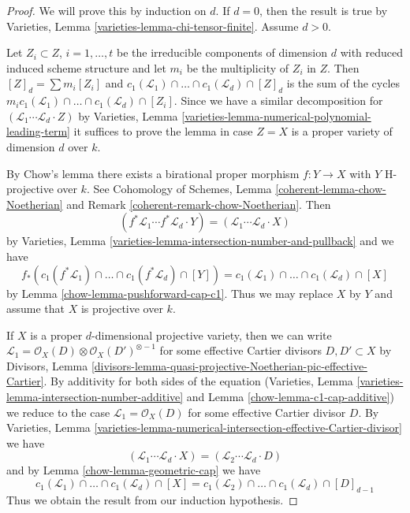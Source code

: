 \begin{proof}

We will prove this by induction on $d$. If $d = 0$, then the result is
true by Varieties, Lemma \ref{varieties-lemma-chi-tensor-finite}.
Assume $d > 0$.

\medskip\noindent
Let $Z_i \subset Z$, $i = 1, \ldots, t$ be the irreducible components
of dimension $d$ with reduced induced scheme structure and let $m_i$ be the
multiplicity of $Z_i$ in $Z$. Then $[Z]_d = \sum m_i[Z_i]$ and
$c_1(\mathcal{L}_1) \cap \ldots \cap c_1(\mathcal{L}_d) \cap [Z]_d$
is the sum of the cycles
$m_i c_1(\mathcal{L}_1) \cap \ldots \cap c_1(\mathcal{L}_d) \cap [Z_i]$.
Since we have a similar decomposition for
$(\mathcal{L}_1 \cdots \mathcal{L}_d \cdot Z)$ by
Varieties, Lemma \ref{varieties-lemma-numerical-polynomial-leading-term}
it suffices to prove the lemma in case $Z = X$
is a proper variety of dimension $d$ over $k$.

\medskip\noindent
By Chow's lemma there exists a birational proper morphism $f : Y \to X$
with $Y$ H-projective over $k$. See Cohomology of Schemes, Lemma
\ref{coherent-lemma-chow-Noetherian} and Remark
\ref{coherent-remark-chow-Noetherian}. Then
$$
(f^*\mathcal{L}_1 \cdots f^*\mathcal{L}_d \cdot Y) =
(\mathcal{L}_1 \cdots \mathcal{L}_d \cdot X)
$$
by Varieties, Lemma \ref{varieties-lemma-intersection-number-and-pullback}
and we have
$$
f_*(c_1(f^*\mathcal{L}_1) \cap \ldots \cap c_1(f^*\mathcal{L}_d) \cap [Y]) =
c_1(\mathcal{L}_1) \cap \ldots \cap c_1(\mathcal{L}_d) \cap [X]
$$
by Lemma \ref{chow-lemma-pushforward-cap-c1}. Thus we may replace $X$ by $Y$
and assume that $X$ is projective over $k$.

\medskip\noindent
If $X$ is a proper $d$-dimensional projective variety, then we can
write $\mathcal{L}_1 = \mathcal{O}_X(D) \otimes \mathcal{O}_X(D')^{\otimes -1}$
for some effective Cartier divisors $D, D' \subset X$
by Divisors, Lemma
\ref{divisors-lemma-quasi-projective-Noetherian-pic-effective-Cartier}.
By additivity for both sides of the equation
(Varieties, Lemma \ref{varieties-lemma-intersection-number-additive} and
Lemma \ref{chow-lemma-c1-cap-additive})
we reduce to the case $\mathcal{L}_1 = \mathcal{O}_X(D)$ for some
effective Cartier divisor $D$.
By Varieties, Lemma
\ref{varieties-lemma-numerical-intersection-effective-Cartier-divisor}
we have
$$
(\mathcal{L}_1 \cdots \mathcal{L}_d \cdot X) =
(\mathcal{L}_2 \cdots \mathcal{L}_d \cdot D)
$$
and by Lemma \ref{chow-lemma-geometric-cap} we have
$$
c_1(\mathcal{L}_1) \cap \ldots \cap c_1(\mathcal{L}_d) \cap [X] =
c_1(\mathcal{L}_2) \cap \ldots \cap c_1(\mathcal{L}_d) \cap [D]_{d - 1}
$$
Thus we obtain the result from our induction hypothesis.
\end{proof}

